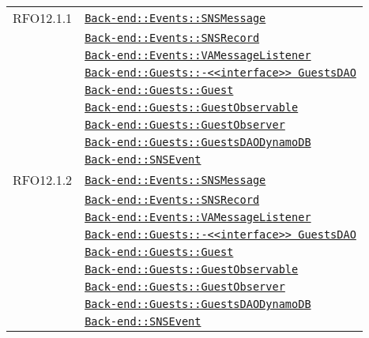 \begin{longtable}{|>{\centering}m{3cm}|m{10cm}<{\centering}|}
RFO12.1.1 & \hyperref[Back-end::Events::SNSMessage]{\texttt{Back-end::Events::SNSMessage}}\\
& \hyperref[Back-end::Events::SNSRecord]{\texttt{Back-end::Events::SNSRecord}}\\
& \hyperref[Back-end::Events::VAMessageListener]{\texttt{Back-end::Events::VAMessageListener}}\\
& \hyperref[Back-end::Guests::<<interface>> GuestsDAO]{\texttt{Back-end::Guests::-\linebreak <<interface>> GuestsDAO}}\\
& \hyperref[Back-end::Guests::Guest]{\texttt{Back-end::Guests::Guest}}\\
& \hyperref[Back-end::Guests::GuestObservable]{\texttt{Back-end::Guests::GuestObservable}}\\
& \hyperref[Back-end::Guests::GuestObserver]{\texttt{Back-end::Guests::GuestObserver}}\\
& \hyperref[Back-end::Guests::GuestsDAODynamoDB]{\texttt{Back-end::Guests::GuestsDAODynamoDB}}\\
& \hyperref[Back-end::SNSEvent]{\texttt{Back-end::SNSEvent}}\\ \hline

RFO12.1.2 & \hyperref[Back-end::Events::SNSMessage]{\texttt{Back-end::Events::SNSMessage}}\\
& \hyperref[Back-end::Events::SNSRecord]{\texttt{Back-end::Events::SNSRecord}}\\
& \hyperref[Back-end::Events::VAMessageListener]{\texttt{Back-end::Events::VAMessageListener}}\\
& \hyperref[Back-end::Guests::<<interface>> GuestsDAO]{\texttt{Back-end::Guests::-\linebreak <<interface>> GuestsDAO}}\\
& \hyperref[Back-end::Guests::Guest]{\texttt{Back-end::Guests::Guest}}\\
& \hyperref[Back-end::Guests::GuestObservable]{\texttt{Back-end::Guests::GuestObservable}}\\
& \hyperref[Back-end::Guests::GuestObserver]{\texttt{Back-end::Guests::GuestObserver}}\\
& \hyperref[Back-end::Guests::GuestsDAODynamoDB]{\texttt{Back-end::Guests::GuestsDAODynamoDB}}\\
& \hyperref[Back-end::SNSEvent]{\texttt{Back-end::SNSEvent}}\\ \hline


\end{longtable}

